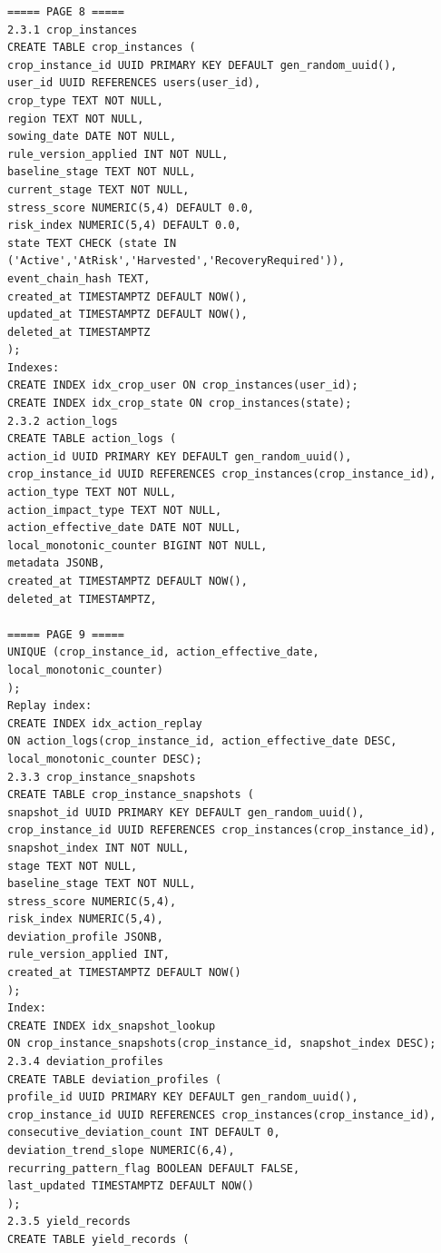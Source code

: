 \documentclass{article}
\begin{document}
\begin{verbatim}
===== PAGE 8 =====
2.3.1 crop_instances
CREATE TABLE crop_instances (
crop_instance_id UUID PRIMARY KEY DEFAULT gen_random_uuid(),
user_id UUID REFERENCES users(user_id),
crop_type TEXT NOT NULL,
region TEXT NOT NULL,
sowing_date DATE NOT NULL,
rule_version_applied INT NOT NULL,
baseline_stage TEXT NOT NULL,
current_stage TEXT NOT NULL,
stress_score NUMERIC(5,4) DEFAULT 0.0,
risk_index NUMERIC(5,4) DEFAULT 0.0,
state TEXT CHECK (state IN ('Active','AtRisk','Harvested','RecoveryRequired')),
event_chain_hash TEXT,
created_at TIMESTAMPTZ DEFAULT NOW(),
updated_at TIMESTAMPTZ DEFAULT NOW(),
deleted_at TIMESTAMPTZ
);
Indexes:
CREATE INDEX idx_crop_user ON crop_instances(user_id);
CREATE INDEX idx_crop_state ON crop_instances(state);
2.3.2 action_logs
CREATE TABLE action_logs (
action_id UUID PRIMARY KEY DEFAULT gen_random_uuid(),
crop_instance_id UUID REFERENCES crop_instances(crop_instance_id),
action_type TEXT NOT NULL,
action_impact_type TEXT NOT NULL,
action_effective_date DATE NOT NULL,
local_monotonic_counter BIGINT NOT NULL,
metadata JSONB,
created_at TIMESTAMPTZ DEFAULT NOW(),
deleted_at TIMESTAMPTZ,

===== PAGE 9 =====
UNIQUE (crop_instance_id, action_effective_date, local_monotonic_counter)
);
Replay index:
CREATE INDEX idx_action_replay
ON action_logs(crop_instance_id, action_effective_date DESC, local_monotonic_counter DESC);
2.3.3 crop_instance_snapshots
CREATE TABLE crop_instance_snapshots (
snapshot_id UUID PRIMARY KEY DEFAULT gen_random_uuid(),
crop_instance_id UUID REFERENCES crop_instances(crop_instance_id),
snapshot_index INT NOT NULL,
stage TEXT NOT NULL,
baseline_stage TEXT NOT NULL,
stress_score NUMERIC(5,4),
risk_index NUMERIC(5,4),
deviation_profile JSONB,
rule_version_applied INT,
created_at TIMESTAMPTZ DEFAULT NOW()
);
Index:
CREATE INDEX idx_snapshot_lookup
ON crop_instance_snapshots(crop_instance_id, snapshot_index DESC);
2.3.4 deviation_profiles
CREATE TABLE deviation_profiles (
profile_id UUID PRIMARY KEY DEFAULT gen_random_uuid(),
crop_instance_id UUID REFERENCES crop_instances(crop_instance_id),
consecutive_deviation_count INT DEFAULT 0,
deviation_trend_slope NUMERIC(6,4),
recurring_pattern_flag BOOLEAN DEFAULT FALSE,
last_updated TIMESTAMPTZ DEFAULT NOW()
);
2.3.5 yield_records
CREATE TABLE yield_records (


\end{verbatim}
\end{document}
